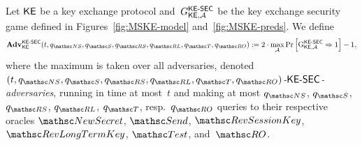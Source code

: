 \begin{definition}
	\label{def:MSKE-security}
	Let $\mathsf{KE}$ be a key exchange protocol and~$G^{\mathsf{KE{\text{\normalfont-}}SEC}}_{\mathsf{KE},\mathcal{A}}$ be the key exchange security game defined 
		in Figures~\ref{fig:MSKE-model} and~\ref{fig:MSKE-preds}.
	We define
	\[
		\Adv^{\KESEC}_{\KE}(t, \qNewSecret, \qSend, \qRevSessionKey, \qRevLongTermKey, \qTest, \qRO) := 2 \cdot \max_\advA \Pr \left[ \Gm^{\KESEC}_{\KE,\advA} \Rightarrow 1 \right] - 1,
	\]
	where the maximum is taken over all adversaries, denoted \emph{$(t\cab \qNewSecret\cab \qSend\cab \qRevSessionKey\cab \qRevLongTermKey\cab \qTest\cab \qRO)$-$\mathsf{KE{\text{\normalfont-}}SEC}$-adversaries},
	running in time at most~$t$ and making at most $\qNewSecret$, $\qSend$, $\qRevSessionKey$, $\qRevLongTermKey$, $\qTest$, resp.\ $\qRO$ queries to their respective oracles $\NewSecret$, $\Send$, $\RevSessionKey$, $\RevLongTermKey$, $\Test$, and~$\RO$.
\end{definition}


